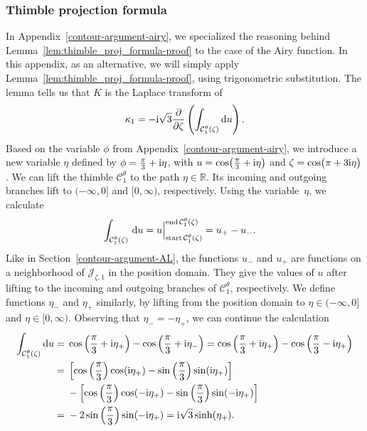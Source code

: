 \documentclass[pdftex]{sigma}
\newcommand{\R}{\mathbb{R}}
\numberwithin{equation}{section}
\begin{document}
\subsubsection{Thimble projection formula}\label{thimble-proj-airy}

In Appendix~\ref{contour-argument-airy}, we specialized the reasoning behind Lemma~\ref{lem:thimble_proj_formula-proof} to the case of the Airy function. In this appendix, as an alternative, we will simply apply Lemma~\ref{lem:thimble_proj_formula-proof}, using trigonometric substitution. The lemma tells us that $K$ is the Laplace transform of
\[ \kappa_1 = -{\rm i}\sqrt{3} \frac{\partial}{\partial \zeta}\left(\int_{\mathcal{C}_1^\theta(\zeta)}  {\rm d}u\right). \]
Based on the variable $\phi$ from Appendix~\ref{contour-argument-airy}, we introduce a new variable $\eta$ defined by ${\phi = \frac{\pi}{3} + {\rm i}\eta}$, with $u = \cos\bigl(\frac{\pi}{3} + {\rm i}\eta\bigr)$ and $\zeta = \cos\bigl(\pi + 3{\rm i}\eta\bigr)$. We can lift the thimble $\mathcal{C}^\theta_1$ to the path $\eta \in \R$. Its incoming and outgoing branches lift to $(-\infty, 0]$ and $[0, \infty)$, respectively. Using the variable~$\eta$, we calculate
\begin{align*}
\int_{\mathcal{C}_1^\theta(\zeta)} \, {\rm d}u & = u \Big|_{\operatorname{start} \mathcal{C}^\theta_1(\zeta)}^{\operatorname{end} \mathcal{C}^\theta_1(\zeta)} = u_+ - u_-.
\end{align*}
Like in Section~\ref{contour-argument-AL}, the functions $u_-$ and $u_+$ are functions on a neighborhood of $\mathcal{J}_{\zeta, 1}$ in the position domain. They give the values of $u$ after lifting to the incoming and outgoing branches of $\mathcal{C}^\theta_1$, respectively. We define functions $\eta_-$ and $\eta_+$ similarly, by lifting from the position domain to $\eta \in (-\infty, 0]$ and $\eta \in [0, \infty)$. Observing that $\eta_- = -\eta_+$, we can continue the calculation
\begin{align*}
\int_{\mathcal{C}_1^\theta(\zeta)} {\rm d}u = {}& \cos\left(\frac{\pi}{3} + {\rm i}\eta_+\right) - \cos\left(\frac{\pi}{3} + {\rm i}\eta_-\right)
 = \cos\left(\frac{\pi}{3} +{\rm i}\eta_+\right) - \cos\left(\frac{\pi}{3} - {\rm i}\eta_+\right) \\
 = {}& \left[\cos\left(\frac{\pi}{3}\right) \cos({\rm i}\eta_+) - \sin\left(\frac{\pi}{3}\right) \sin({\rm i}\eta_+)\right] \\
& - \left[\cos\left(\frac{\pi}{3}\right) \cos(-{\rm i}\eta_+) - \sin\left(\frac{\pi}{3}\right) \sin(-{\rm i}\eta_+)\right] \\
 = {}&-2 \sin\left(\frac{\pi}{3}\right) \sin(-{\rm i}\eta_+)
 = {\rm i}\sqrt{3} \sinh(\eta_+).
\end{align*}
\end{document}
